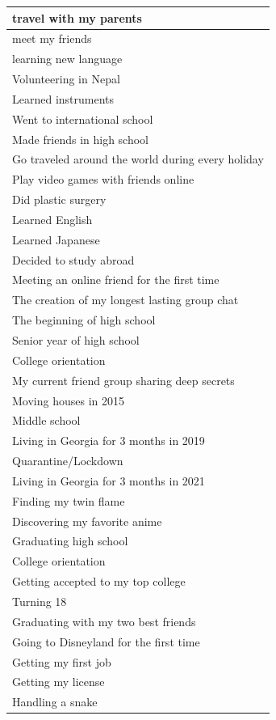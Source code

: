 \documentclass[
  .7em,
  letterpaper,
  DIV=11,
  numbers=noendperiod]{scrartcl}
\begin{document}
\begin{table}
\begin{tabular}{l}
\hline
travel with my parents\\
\hline
meet my friends\\
\hline
learning new language\\
\hline
Volunteering in Nepal\\
\hline
Learned instruments\\
\hline
Went to international school\\
\hline
Made friends in high school\\
\hline
Go traveled around the world during every holiday\\
\hline
Play video games with friends online\\
\hline
Did plastic surgery\\
\hline
Learned English\\
\hline
Learned Japanese\\
\hline
Decided to study abroad\\
\hline
Meeting an online friend for the first time\\
\hline
The creation of my longest lasting group chat\\
\hline
The beginning of high school\\
\hline
Senior year of high school\\
\hline
College orientation\\
\hline
My current friend group sharing deep secrets\\
\hline
Moving houses in 2015\\
\hline
Middle school\\
\hline
Living in Georgia for 3 months in 2019\\
\hline
Quarantine/Lockdown\\
\hline
Living in Georgia for 3 months in 2021\\
\hline
Finding my twin flame\\
\hline
Discovering my favorite anime\\
\hline
Graduating high school\\
\hline
College orientation\\
\hline
Getting accepted to my top college\\
\hline
Turning 18\\
\hline
Graduating with my two best friends\\
\hline
Going to Disneyland for the first time\\
\hline
Getting my first job\\
\hline
Getting my license\\
\hline
Handling a snake\\

\end{tabular}
\end{table}
\end{document}
